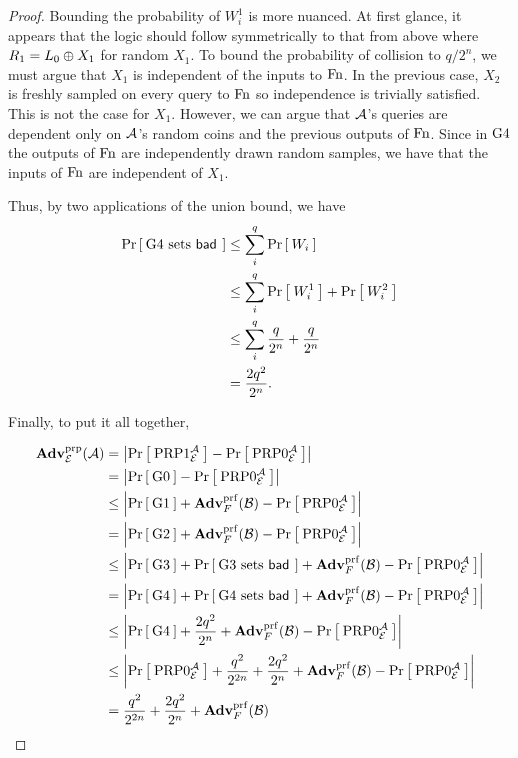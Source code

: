 \begin{proof}
Bounding the probability of $W_i^1$ is more nuanced.
At first glance, it appears that the logic should follow symmetrically to that from above where $R_1 = L_0\xor X_1$ for random $X_1$.
To bound the probability of collision to $q/2^n$, we must argue that $X_1$ is independent of the inputs to $\Fn$.
In the previous case, $X_2$ is freshly sampled on every query to $\Fn$ so independence is trivially satisfied.
This is not the case for $X_1$.
However, we can argue that $\advA$'s queries are dependent only on $\advA$'s random coins and the previous outputs of $\Fn$.
Since in $\G4$ the outputs of $\Fn$ are independently drawn random samples, we have that the inputs of $\Fn$ are independent of $X_1$.

Thus, by two applications of the union bound, we have
\begin{align*}
  \Prob{\G4 \setsbad} &\le \sum_i^q \Prob{W_i}\\
  &\le \sum_i^q \Prob{W_i^1} + \Prob{W_i^2}\\
  &\le \sum_i^q \frac{q}{2^n} + \frac{q}{2^n}\\
  &= \frac{2q^2}{2^n}.
\end{align*}

Finally, to put it all together,

\begin{align*}
\AdvPRP{\Feistel}{\advA}
    &=\left|\Prob{\PRP1^\advA_\Feistel} - \Prob{\PRP0^\advA_\Feistel}\right|\\
    &= \left|\Prob{\G0} - \Prob{\PRP0^\advA_\cipher}\right|\\
    &\le \left|\Prob{\G1} + \AdvPRF{F}{\advB} - \Prob{\PRP0^\advA_\cipher}\right|\\
    &=   \left|\Prob{\G2} + \AdvPRF{F}{\advB} - \Prob{\PRP0^\advA_\cipher}\right|\\
    &\le \left|\Prob{\G3} + \Prob{\G3\setsbad} + \AdvPRF{F}{\advB} - \Prob{\PRP0^\advA_\cipher}\right|\\
    &= \left|\Prob{\G4} + \Prob{\G4\setsbad} + \AdvPRF{F}{\advB} - \Prob{\PRP0^\advA_\cipher}\right|\\
    &\le \left|\Prob{\G4} + \frac{2q^2}{2^n} + \AdvPRF{F}{\advB} - \Prob{\PRP0^\advA_\cipher}\right|\\
    &\le \left|\Prob{\PRP0^\advA_\cipher} + \frac{q^2}{2^{2n}} + \frac{2q^2}{2^n} + \AdvPRF{F}{\advB} - \Prob{\PRP0^\advA_\cipher}\right|\\
    &= \frac{q^2}{2^{2n}} + \frac{2q^2}{2^n} + \AdvPRF{F}{\advB}\\
\end{align*}

\end{proof}

